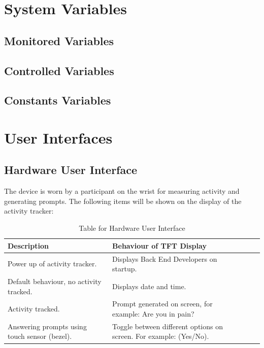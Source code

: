 \documentclass[12pt, titlepage]{article}
\begin{document}
\section{System Variables}


\subsection{Monitored Variables}

\subsection{Controlled Variables}

\subsection{Constants Variables}

\section{User Interfaces}

\subsection{Hardware User Interface}

The device is worn by a participant on the wrist for measuring activity and generating  prompts. The following items will be shown on the display of the activity tracker:
\begin{table}[H]
	\begin{tabularx}{1.05\textwidth} { 
		  | >{\centering\arraybackslash}X 
		  | >{\centering\arraybackslash}X 
		  | >{\centering\arraybackslash}X 
		  | >{\centering\arraybackslash}X | }
		 \hline
		 Description & Behaviour of TFT Display \\
		 \hline
		Power up of activity tracker. & Displays Back End Developers on startup.\\
		\hline
		 Default behaviour, no activity tracked.  & Displays date and time.\\
		 \hline
		   Activity tracked. & Prompt generated on screen, for example: Are you in pain?\\
		\hline 
		Answering prompts using touch sensor (bezel). & Toggle between different 				options on screen. For example: (Yes/No).\\
		\hline
	\end{tabularx}
\caption{\label{Hardware User Interface}Table for Hardware User Interface}  
\end{table}
\end{document}
